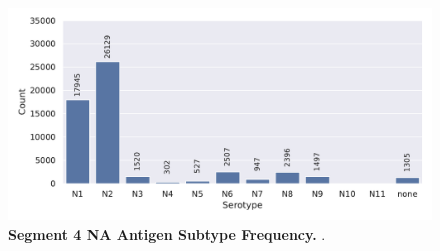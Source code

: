 \begin{figure}[!hbt]
    \centering
    \includegraphics[width=\textwidth]{PCA/Data_Overview_Segment_6_N.pdf}
    \caption[Segment 6 \Acrlong{NA} Antigen Subtype Frequency]{\textbf{Segment 4 \Acrlong{NA} Antigen Subtype Frequency.} .}
    \label{fig:Frequency_6}
\end{figure}











